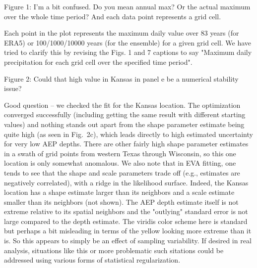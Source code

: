 \documentclass[12pt,english]{reviewresponse}
\begin{document}
\begin{revcomment}
 Figure 1: I'm a bit confused. Do you mean annual max? Or the actual maximum over the whole time period? And each data point represents a grid cell.
   
\end{revcomment}
\begin{revresponse}
Each point in the plot represents the maximum daily value over 83 years (for ERA5) or 100/1000/10000 years (for the ensemble) for a given grid cell. We have tried to clarify this by revising the Figs. 1 and 7 captions to say "Maximum daily precipitation for each grid cell over the specified time period". 

\end{revresponse}
\begin{revcomment}
Figure 2: Could that high value in Kansas in panel e be a numerical stability issue?
    
\end{revcomment}
\begin{revresponse}
Good question -- we checked the fit for the Kansas location. The optimization converged successfully (including getting the same result with different starting values) and nothing stands out apart from the shape parameter estimate being quite high (as seen in Fig.\ 2c), which leads directly to high estimated uncertainty for very low AEP depths. There are other fairly high shape parameter estimates in a swath of grid points from western Texas through Wisconsin, so this one location is only somewhat anomalous. We also note that in EVA fitting, one tends to see that the shape and scale parameters trade off (e.g., estimates are negatively correlated), with a ridge in the likelihood surface. Indeed, the Kansas location has a shape estimate larger than its neighbors and a scale estimate smaller than its neighbors (not shown). The AEP depth estimate itself is not extreme relative to its spatial neighbors and the "outlying" standard error is not large compared to the depth estimate. The viridis color scheme here is standard but perhaps a bit misleading in terms of the yellow looking more extreme than it is. So this appears to simply be an effect of sampling variability. If desired in real analysis, situations like this or more problematic such sitations could be addressed using various forms of statistical regularization.

\end{revresponse}
\end{document}
